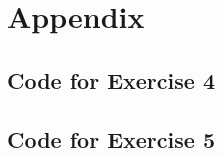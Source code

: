 \documentclass[12pt]{article}
\begin{document}
    

\section*{Appendix}\label{appendix}
\subsection*{Code for Exercise 4}

\subsection*{Code for Exercise 5}

% 
% 
\end{document}
